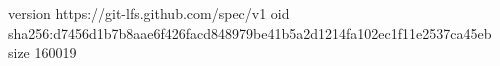 version https://git-lfs.github.com/spec/v1
oid sha256:d7456d1b7b8aae6f426facd848979be41b5a2d1214fa102ec1f11e2537ca45eb
size 160019
